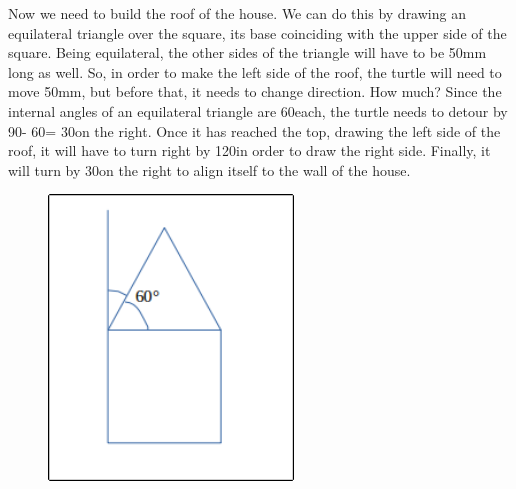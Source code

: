 \begin{minipage}{0.45\textwidth}

Now we need to build the roof of the house. We can do this by drawing an equilateral triangle over the square, its base coinciding with the upper side of the square. Being equilateral, the other sides of the triangle will have to be 50mm long as well. So, in order to make the left side of the roof, the turtle will need to move 50mm, but before that, it needs to change direction. How much? Since the internal angles of an equilateral triangle are 60\degree each, the turtle needs to detour by 90\degree - 60\degree = 30\degree  on the right. Once it has reached the top, drawing the left side of the roof, it will have to turn right by 120\degree in order to draw the right side. Finally, it will turn by 30\degree  on the right to align itself to the wall of the house.

\end{minipage}
\begin{minipage}{0.5\textwidth}
\begin{figure}[H]
   \includegraphics[width=6.5cm,trim=4 4 8 4,clip]{./images/disegnare/disegnare-6.png}
   \label{dis-6}
\end{figure}
\end{minipage} \hfill

\vskip 1cm

